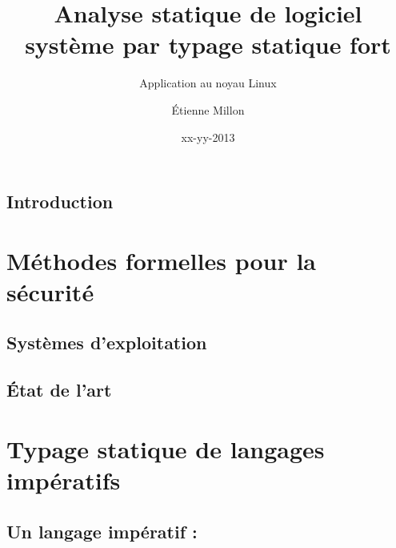 \documentclass[a4paper,11pt]{memoir}
\title{Analyse statique de logiciel système par typage statique fort}
\subtitle{Application au noyau Linux}
\author{Étienne Millon}
\date{xx-yy-2013}
\begin{document}
\frontmatter

\begin{titlingpage}
\titleUL{}
\end{titlingpage}

\cleartorecto

\asuabstract



\asuacknowledgements




\tableofcontents

\mainmatter

\chapter{Introduction}

\label{cha:intro}



\part{Méthodes formelles pour la sécurité}
\label{part:ctx}



\chapter{Systèmes d'exploitation}

\label{cha:os}



%

\chapter{État de l'art}

\label{cha:etatdelart}


\part{Typage statique de langages impératifs}
\label{part:lang}



\chapter{Un langage impératif : \langname}
\end{document}
